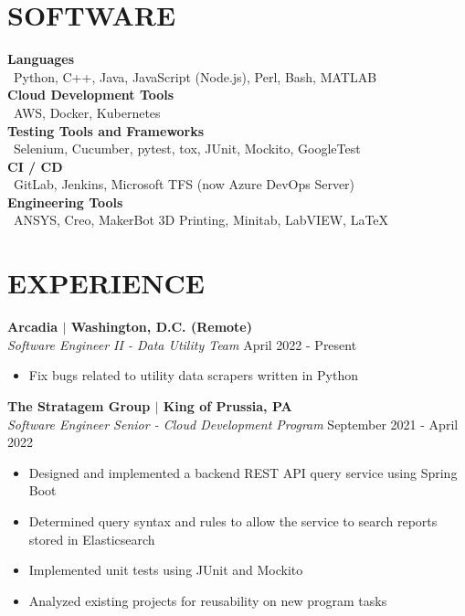 \documentclass[line,resmargin,11pt]{res}
\begin{document}
\begin{resume}
\section{SOFTWARE}
\textbf{Languages} \\
\textbullet\ Python, C++, Java, JavaScript (Node.js), Perl, Bash, MATLAB  \\
\textbf{Cloud Development Tools} \\
\textbullet\ AWS, Docker, Kubernetes \\
\textbf{Testing Tools and Frameworks} \\
\textbullet\ Selenium, Cucumber, pytest, tox, JUnit, Mockito, GoogleTest \\
\textbf{CI / CD} \\
\textbullet\ GitLab, Jenkins, Microsoft TFS (now Azure DevOps Server) \\
\textbf{Engineering Tools} \\
\textbullet\ ANSYS, Creo, MakerBot 3D Printing, Minitab, LabVIEW, \LaTeX        
 
\section{EXPERIENCE}
\textbf{Arcadia $|$ Washington, D.C. (Remote)} \\
{\sl Software Engineer II - Data Utility Team} \hfill April 2022 - Present
\begin{itemize}
	\item Fix bugs related to utility data scrapers written in Python
\end{itemize}

\textbf{The Stratagem Group $|$ King of Prussia, PA} \\
{\sl Software Engineer Senior - Cloud Development Program} \hfill September 2021 - April 2022
	\begin{itemize} \itemsep -2pt %
		\item Designed and implemented a backend REST API query service using Spring Boot
		\item Determined query syntax and rules to allow the service to search reports stored in Elasticsearch\
		\item Implemented unit tests using JUnit and Mockito
		\item Analyzed existing projects for reusability on new program tasks
	\end{itemize}


\end{resume}
\end{document}
